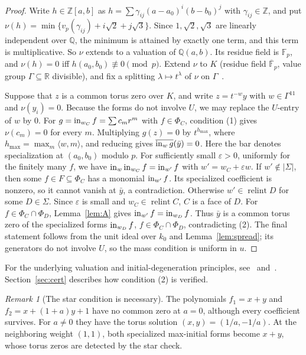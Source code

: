 \documentclass[11pt]{amsart}
\theoremstyle{definition}\newtheorem{definition}[theorem]{Definition}\theoremstyle{remark}\newtheorem{remark}[theorem]{Remark}
\begin{document}
\begin{proof}
Write $h\in\mathbb{Z}[a,b]$ as $h=\sum\gamma_{ij}(a-a_0)^i(b-b_0)^j$ with $\gamma_{ij}\in\mathbb{Z}$, and put
$\nu(h)=\min\{v_p(\gamma_{ij})+i\sqrt2+j\sqrt3\}$. Since $1,\sqrt2,\sqrt3$ are linearly independent over $\mathbb{Q}$, the minimum is attained by exactly one
term, and this term is multiplicative. So $\nu$ extends to a valuation of $\mathbb{Q}(a,b)$. Its residue field is $\mathbb{F}_p$, and
$\nu(h)=0$ iff $h(a_0,b_0)\not\equiv0\pmod p$. Extend $\nu$ to $K$ (residue field $\overline{\mathbb{F}}_p$, value group $\Gamma\subseteq\mathbb{R}$ divisible), and fix a splitting
$\lambda\mapsto t^\lambda$ of $\nu$ on $\Gamma$~\citep[Lemma~2.1.15]{MS}.

Suppose that $z$ is a common torus zero over $K$, and write $z=t^{-w}y$ with $w\in\Gamma^{11}$ and $\nu(y_i)=0$. Because the forms do not involve $U$, we may replace the $U$-entry of $w$ by $0$. For $g=\operatorname{in}_{w_C}f=\sum c_m r^m$ with $f\in\Phi_C$, condition (1) gives $\nu(c_m)=0$ for every $m$. Multiplying $g(z)=0$ by
$t^{h_{\max}}$, where $h_{\max}=\max_m\langle w,m\rangle$, and reducing gives $\overline{\operatorname{in}_w g}(\bar y)=0$. Here the bar denotes specialization at $(a_0,b_0)$ modulo $p$.
For sufficiently small $\varepsilon>0$, uniformly for the finitely many $f$, we have $\operatorname{in}_w\operatorname{in}_{w_C}f=\operatorname{in}_{w'}f$ with $w'=w_C+\varepsilon w$.
If $w'\notin|\Sigma|$, then some $f\in F\subseteq\Phi_C$ has a monomial $\operatorname{in}_{w'}f$. Its specialized coefficient is nonzero, so it cannot vanish at $\bar y$, a contradiction.
Otherwise $w'\in\operatorname{relint}D$ for some $D\in\Sigma$. Since $\varepsilon$ is small and $w_C\in\operatorname{relint}C$, $C$ is a face of $D$.
For $f\in\Phi_C\cap\Phi_D$, Lemma~\ref{lem:A} gives $\operatorname{in}_{w'}f=\operatorname{in}_{w_D}f$. Thus $\bar y$ is a common torus zero of the specialized forms $\operatorname{in}_{w_D}f$, $f\in\Phi_C\cap\Phi_D$, contradicting (2). The final statement follows from the unit ideal over $k_0$ and Lemma~\ref{lem:spread}; its generators do not involve $U$, so the mass condition is uniform in $u$.
\end{proof}
For the underlying valuation and initial-degeneration principles, see~\citep[Theorem~5.6]{Gub} and~\citep{MS}. Section~\ref{sec:cert} describes how condition (2) is verified.

\begin{remark}[The star condition is necessary]
The polynomials $f_1=x+y$ and $f_2=x+(1+a)y+1$ have no common zero at $a=0$, although every coefficient survives. For $a\ne0$ they have the torus solution $(x,y)=(1/a,-1/a)$. At the neighboring weight $(1,1)$, both specialized max-initial forms become $x+y$, whose torus zeros are detected by the star check.
\end{remark}
\end{document}
